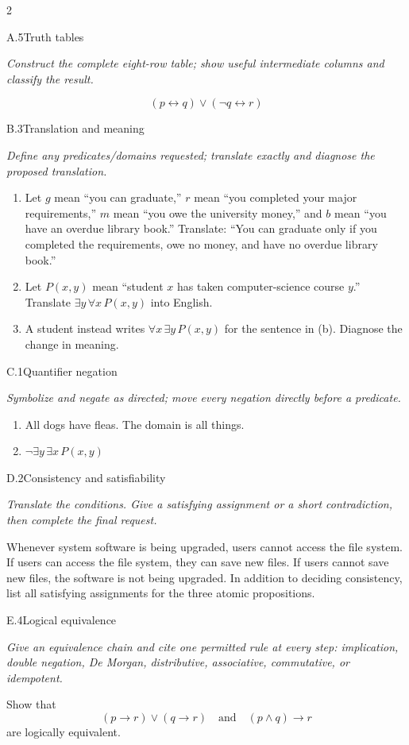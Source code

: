 \documentclass[9pt]{extarticle}
\begin{document}
\begin{multicols}{2}
\begin{CoreProblem}{A.5}{Truth tables}
{\scriptsize\textit{Construct the complete eight-row table; show useful intermediate columns and classify the result.}\par}
\[
  (p\leftrightarrow q)\lor(\neg q\leftrightarrow r)
\]
\end{CoreProblem}
\begin{CoreProblem}{B.3}{Translation and meaning}
{\scriptsize\textit{Define any predicates/domains requested; translate exactly and diagnose the proposed translation.}\par}
\begin{enumerate}[label=(\alph*)]
  \item Let $g$ mean ``you can graduate,'' $r$ mean ``you completed your major
        requirements,'' $m$ mean ``you owe the university money,'' and $b$
        mean ``you have an overdue library book.'' Translate: ``You can
        graduate only if you completed the requirements, owe no money, and
        have no overdue library book.''
  \item Let $P(x,y)$ mean ``student $x$ has taken computer-science course
        $y$.'' Translate $\exists y\,\forall x\,P(x,y)$ into English.
  \item A student instead writes $\forall x\,\exists y\,P(x,y)$ for the
        sentence in (b). Diagnose the change in meaning.
\end{enumerate}
\end{CoreProblem}
\begin{CoreProblem}{C.1}{Quantifier negation}
{\scriptsize\textit{Symbolize and negate as directed; move every negation directly before a predicate.}\par}
\begin{enumerate}[label=(\alph*)]
  \item All dogs have fleas. The domain is all things.
  \item $\neg\exists y\,\exists x\,P(x,y)$
\end{enumerate}
\end{CoreProblem}
\columnbreak
\begin{CoreProblem}{D.2}{Consistency and satisfiability}
{\scriptsize\textit{Translate the conditions. Give a satisfying assignment or a short contradiction, then complete the final request.}\par}
Whenever system software is being upgraded, users cannot access the file
system. If users can access the file system, they can save new files. If users
cannot save new files, the software is not being upgraded. In addition to
deciding consistency, list all satisfying assignments for the three atomic
propositions.
\end{CoreProblem}
\begin{CoreProblem}{E.4}{Logical equivalence}
{\scriptsize\textit{Give an equivalence chain and cite one permitted rule at every step: implication, double negation, De Morgan, distributive, associative, commutative, or idempotent.}\par}
Show that
\[
  (p\to r)\lor(q\to r)
  \quad\text{and}\quad
  (p\land q)\to r
\]
are logically equivalent.
\end{CoreProblem}
\end{multicols}
\end{document}
